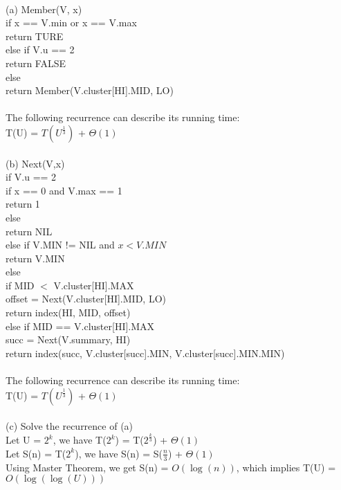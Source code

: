 \begin{problem}{5} ~\\
(a) Member(V, x)\\
\tab if x == V.min or x == V.max\\
\tab\tab return TURE\\
\tab else if V.u == 2\\
\tab\tab return FALSE\\
\tab else\\
\tab\tab return Member(V.cluster[HI].MID, LO)\\
\\
\tab The following recurrence can describe its running time:\\
\tab\tab T(U) = $T({U}^{\frac{1}{3}})$ + $\Theta(1)$\\
\\
(b) Next(V,x)\\
\tab if V.u == 2\\
\tab\tab if x == 0 and V.max == 1\\
\tab\tab\tab return 1\\
\tab\tab else\\
\tab\tab\tab return NIL\\
\tab else if V.MIN != NIL and $x < V.MIN$\\
\tab\tab return V.MIN\\
\tab else\\ 
\tab\tab if MID $<$ V.cluster[HI].MAX\\
\tab\tab\tab offset = Next(V.cluster[HI].MID, LO)\\
\tab\tab\tab return index(HI, MID, offset)\\
\tab\tab else if MID == V.cluster[HI].MAX\\
\tab\tab\tab succ = Next(V.summary, HI)\\
\tab\tab\tab return index(succ, V.cluster[succ].MIN, V.cluster[succ].MIN.MIN)\\
\\
\tab The following recurrence can describe its running time:\\
\tab\tab T(U) = $T({U}^{\frac{1}{3}})$ + $\Theta(1)$\\
\\
(c) Solve the recurrence of (a)\\
\tab Let U = ${2}^{k}$, we have T($2^{k}$) = T($2^{\frac{k}{3}}$) + $\Theta(1)$\\
\tab Let S(n) = T($2^{k}$), we have S(n) = S($\frac{n}{3}$) + $\Theta(1)$\\
Using Master Theorem, we get S(n) = $O(\log(n))$, which implies T(U) = $O(\log(\log(U)))$
\end{problem}